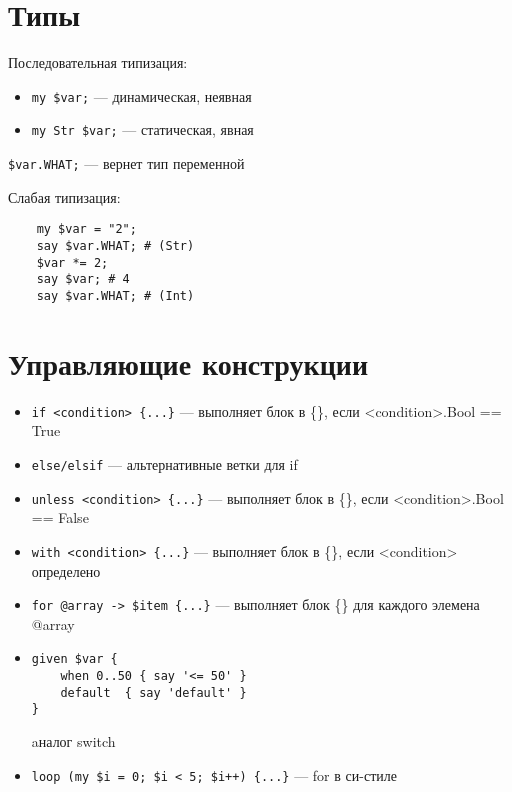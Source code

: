 \documentclass[12pt,a4paper,oneside,titlepage]{article}
\begin{document}
\begin{multicols*}{2}

  \section{Типы}

  Последовательная типизация:

  \begin{itemize}
    \item{\lstinline|my $var;| --- динамическая, неявная}
    \item{\lstinline|my Str $var;| --- статическая, явная}
  \end{itemize}

  \lstinline|$var.WHAT;| --- вернет тип переменной

  Слабая типизация:
  \begin{lstlisting}
    my $var = "2";
    say $var.WHAT; # (Str)
    $var *= 2;
    say $var; # 4
    say $var.WHAT; # (Int)
  \end{lstlisting}

  \section{Управляющие конструкции}

  \begin{itemize}
    \item{\lstinline|if <condition> {...}| --- выполняет блок в \{\}, если <condition>.Bool == True}
    \item{\lstinline|else/elsif| --- альтернативные ветки для if}
    \item{\lstinline|unless <condition> {...}| --- выполняет блок в \{\}, если <condition>.Bool == False}
    \item{\lstinline|with <condition> {...}| --- выполняет блок в \{\}, если <condition> определено}
    \item{\lstinline|for @array -> $item {...}| --- выполняет блок \{\} для каждого элемена @array}
    \item{\begin{lstlisting}
given $var {
    when 0..50 { say '<= 50' }
    default  { say 'default' }
}
\end{lstlisting}
          aналог switch}
    \item{\lstinline|loop (my $i = 0; $i < 5; $i++) {...}| --- for в си-стиле}
  \end{itemize}


\end{multicols*}
\end{document}
